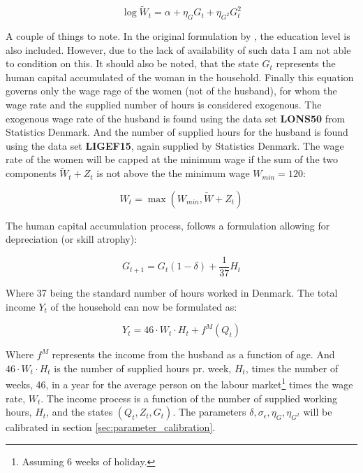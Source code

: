 \begin{equation}
    \log \tilde{W}_t = \alpha + \eta_G G_t + \eta_{G^2} G_t^2
\end{equation}

A couple of things to note. In the original formulation by \textcite{lemieux_mincer_2006}, the education level is also included. However, due to the lack of availability of such data I am not able to condition on this. It should also be noted, that the state $G_t$ represents the human capital accumulated of the woman in the household. Finally this equation governs only the wage rage of the women (not of the husband), for whom the wage rate and the supplied number of hours is considered exogenous. The exogenous wage rate of the husband is found using the data set \textbf{LONS50} from Statistics Denmark. And the number of supplied hours for the husband is found using the data set \textbf{LIGEF15}, again supplied by Statistics Denmark. The wage rate of the women will be capped at the minimum wage if the sum of the two components $\tilde{W}_t + Z_t$ is not above the the minimum wage $W_{min} = 120$: 

\begin{equation}
    W_t = \max ( W_{min}, \tilde{W} + Z_t)
\end{equation}

The human capital accumulation process, follows a formulation allowing for depreciation (or skill atrophy):

\begin{equation}
    G_{t+1} = G_t (1-\delta)  + \frac{1}{37} H_t 
\end{equation}

Where 37 being the standard number of hours worked in Denmark. The total income $Y_t$ of the household can now be formulated as:

\begin{equation}
    Y_t = 46 \cdot W_t \cdot H_t + f^M(Q_t)
\end{equation}

Where $f^M$ represents the income from the husband as a function of age. And $46 \cdot W_t \cdot H_t$ is the number of supplied hours pr. week, $H_t$, times the number of weeks, 46, in a year for the average person on the labour market\footnote{Assuming 6 weeks of holiday.} times the wage rate, $W_t$. The income process is a function of the number of supplied working hours, $H_t$, and the states $(Q_t, Z_t, G_t)$. The parameters $\delta, \sigma_\epsilon, \eta_G, \eta_{G^{2}}$ will be calibrated in section \ref{sec:parameter_calibration}.

